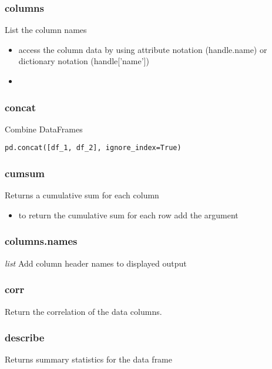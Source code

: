 %
\subsubsection{columns}
List the column names
  \begin{itemize}

    \item access the column data by using attribute notation (handle.name) or
      dictionary notation (handle['name'])

    \item \color{red}{If the column name is more than one word you must use
      the dictionary notation}
  \end{itemize}

%
\subsubsection{concat}
Combine DataFrames
\begin{lstlisting}
pd.concat([df_1, df_2], ignore_index=True)
\end{lstlisting}

%
\subsubsection{cumsum}
Returns a cumulative sum for each column
  \begin{itemize}

    \item to return the cumulative sum for each row add the argument
      \color{red}{axis=1}
  \end{itemize}

%
\subsubsection{columns.names}
\textit{list} Add column header names to displayed output

%
\subsubsection{corr}
Return the correlation of the data columns.

%
\subsubsection{describe}
Returns summary statistics for the data frame

%
